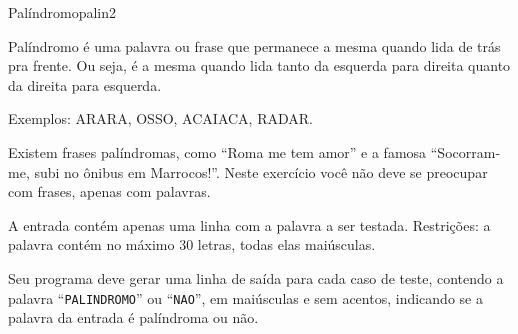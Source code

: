 \documentclass[12pt,a4paper,oneside]{article}
\begin{document}
\begin{problem}{Palíndromo}{palin}{2}
 
Palíndromo é uma palavra ou frase que permanece a mesma quando lida de trás pra frente. Ou seja, é a mesma quando lida tanto da esquerda para direita quanto da direita para esquerda.

Exemplos: ARARA, OSSO, ACAIACA, RADAR.

Existem frases palíndromas, como ``Roma me tem amor'' e a famosa ``Socorram-me, subi no ônibus em Marrocos!''. Neste exercício você não deve se preocupar com frases, apenas com palavras.


%

\InputFile

A entrada contém apenas uma linha com a palavra a ser testada. Restrições: a palavra contém no máximo 30 letras, todas elas maiúsculas.

\OutputFile

Seu programa deve gerar uma linha de saída para cada caso de teste, contendo a palavra ``\texttt{PALINDROMO}'' ou ``\texttt{NAO}'', em maiúsculas e sem acentos, indicando se a palavra da entrada é palíndroma ou não.


\Example

\begin{example}
%
\end{example}

\begin{example}
%
\end{example}

\begin{example}
%
\end{example}

\begin{example}
%
\end{example}


\end{problem}
\end{document}
